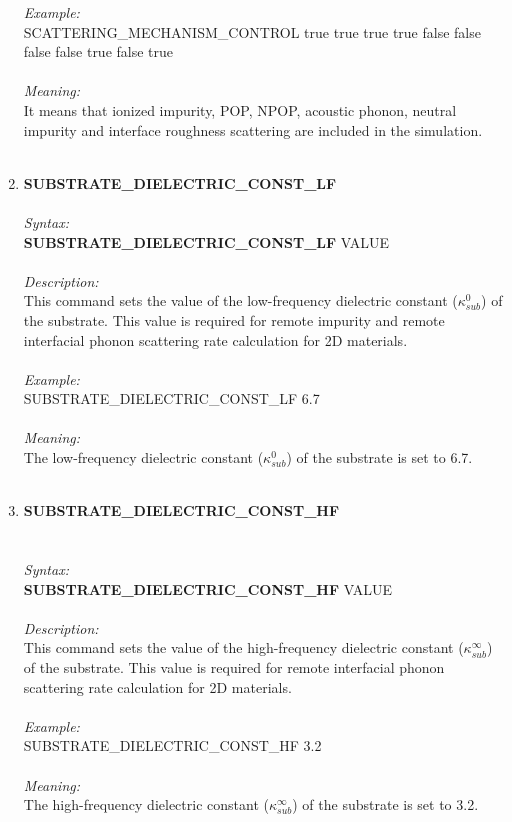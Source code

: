 \documentclass[12pt]{article}
\begin{document}
\begin{enumerate}
    \textit{Example:} \\
    SCATTERING\_MECHANISM\_CONTROL true true true true false false false false true false true \\ \\
    \textit{Meaning:} \\    
    It means that ionized impurity, POP, NPOP, acoustic phonon, neutral impurity and interface roughness scattering are included in the simulation. \\ \\
    
    \item \textbf{SUBSTRATE\_DIELECTRIC\_CONST\_LF} \\  \\
    \textit{Syntax:} \\
    \textbf{SUBSTRATE\_DIELECTRIC\_CONST\_LF} VALUE \\ \\
    \textit{Description:} \\
    This command sets the value of the low-frequency dielectric constant ($\kappa_{sub}^0$) of the substrate. This value is required for remote impurity and remote interfacial phonon scattering rate calculation for 2D materials. \\ \\
    \textit{Example:} \\
    SUBSTRATE\_DIELECTRIC\_CONST\_LF 6.7 \\ \\
    \textit{Meaning:} \\    
    The low-frequency dielectric constant ($\kappa_{sub}^0$) of the substrate is set to 6.7. \\ \\ 
    
    \item \textbf{SUBSTRATE\_DIELECTRIC\_CONST\_HF}  \\ \\ \\
    \textit{Syntax:} \\
    \textbf{SUBSTRATE\_DIELECTRIC\_CONST\_HF} VALUE \\ \\
    \textit{Description:} \\
    This command sets the value of the high-frequency dielectric constant ($\kappa_{sub}^{\infty}$) of the substrate. This value is required for remote interfacial phonon scattering rate calculation for 2D materials. \\ \\
    \textit{Example:} \\
    SUBSTRATE\_DIELECTRIC\_CONST\_HF 3.2 \\ \\
    \textit{Meaning:} \\    
    The high-frequency dielectric constant ($\kappa_{sub}^{\infty}$) of the substrate is set to 3.2. \\ \\
    

\end{enumerate}
\end{document}
